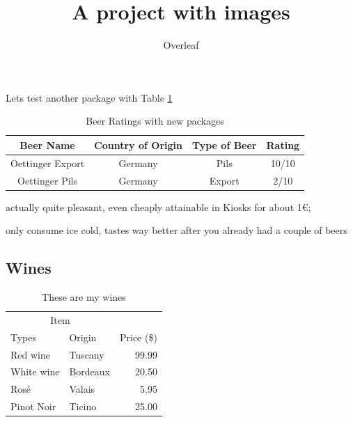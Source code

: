 \documentclass{article}
\begin{document}
\par
Lets test another package with Table \ref{table:2}
\begin{table}[h]
\begin{center}
\begin{threeparttable}
\begin{tabular}{c c c c}
    \toprule
    \textbf{Beer Name} & \textbf{Country of Origin} & \textbf{Type of Beer} & \textbf{Rating} \\ 
    \midrule
      Oettinger Export\tnote{1}   & Germany & Pils & 10/10 \\
      Oettinger Pils\tnote{2}   & Germany & Export & 2/10 \\ 
      \bottomrule
\end{tabular}
\begin{tablenotes}
\item[1] actually quite pleasant, even cheaply attainable in Kiosks for about 1€; \item[2] only consume ice cold, tastes way better after you already had a couple of beers
\end{tablenotes}
\end{threeparttable}
\end{center}
\caption{Beer Ratings with new packages}{}
\label{table:2}
\end{table}

\newpage
\subsection{Wines }
\begin{table}[h]
\centering
\begin{tabular}{llr}
\hline
\multicolumn{2}{c}{Item} \\
\cline{1-2}
Types    & Origin & Price (\$) \\
\hline
Red wine      & Tuscany     & 99.99      \\
White wine       & Bordeaux     & 20.50      \\
Rosé       & Valais     & 5.95      \\
Pinot Noir & Ticino      & 25.00       \\
\hline
\end{tabular}
\caption{These are my wines}
 \label{table:3}
\end{table}

\title{A project with images}
\author{Overleaf}
\date{}
\end{document}
